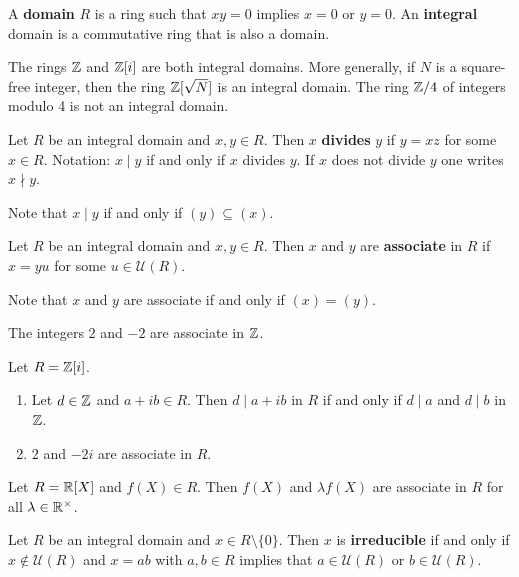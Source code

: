 \begin{definition}
    A \textbf{domain} $R$ is a ring such that $xy=0$ implies $x=0$ or $y=0$. 
    An \textbf{integral} domain is a commutative ring that is also a domain. 
\end{definition}

The rings $\mathbb{Z}$ and $\mathbb{Z}[i]$ are both integral domains. 
More generally, if $N$ is a square-free integer, 
then the ring $\mathbb{Z}[\sqrt{N}]$ is an integral domain.  
The ring $\mathbb{Z}/4$ of 
integers modulo 4 is not an integral domain. 

\begin{definition}
	Let $R$ be an integral domain and $x,y\in R$. Then $x$ \textbf{divides} $y$ 
	if $y=xz$ for some $x\in R$. 
	Notation: $x\mid y$ if and only if $x$ divides $y$. If $x$ does not
	divide $y$ one writes $x\nmid y$.  
\end{definition}

Note that $x\mid y$ if and only if $(y)\subseteq (x)$.
	
\begin{definition}
	Let $R$ be an integral domain and $x,y\in R$. Then $x$ and $y$ are
	\textbf{associate} in $R$ if $x=yu$ for some $u\in\mathcal{U}(R)$. 
\end{definition}

Note that $x$ and $y$ are associate if and only if $(x)=(y)$.  

\begin{example}
	The integers $2$ and $-2$ are associate in $\mathbb{Z}$.	
\end{example}

\begin{example}
	Let $R=\mathbb{Z}[i]$. 
	\begin{enumerate}
		\item Let $d\in\mathbb{Z}$ and $a+ib\in R$. Then $d\mid a+ib$ in $R$ if and only if 
			$d\mid a$ and $d\mid b$ in $\mathbb{Z}$. 
		\item $2$ and $-2i$ are associate in $R$.
	\end{enumerate} 	
\end{example}

\begin{example}
	Let $R=\mathbb{R}[X]$ and $f(X)\in R$. Then $f(X)$ and $\lambda f(X)$ are 
	associate in $R$ for all $\lambda\in\mathbb{R}^{\times}$. 	
\end{example}

\begin{definition}
	Let $R$ be an integral domain and $x\in R\setminus\{0\}$. Then $x$ is \textbf{irreducible} 
	if and only if $x\not\in\mathcal{U}(R)$ 
	and $x=ab$ with $a,b\in R$ implies that $a\in\mathcal{U}(R)$ or $b\in\mathcal{U}(R)$. 
\end{definition}

